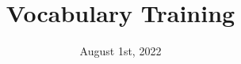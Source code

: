 \documentclass{ctexart}
\title{Vocabulary Training}
\date{August 1st, 2022}
\begin{document}
\maketitle
\begin{multicols}{2}

\end{multicols}
\end{document}
